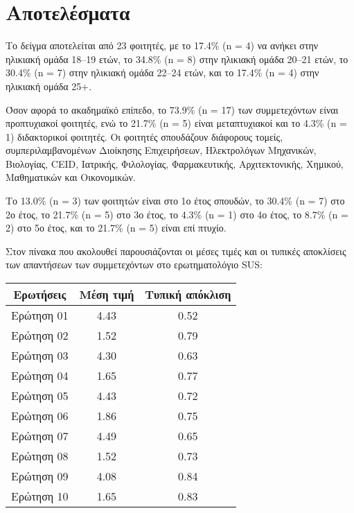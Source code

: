     \section{Αποτελέσματα}
        Το δείγμα αποτελείται από 23 φοιτητές, με το 17.4\% (n = 4) να ανήκει στην ηλικιακή ομάδα 18--19 ετών, το 34.8\% (n = 8) στην ηλικιακή ομάδα 20--21 ετών, το 30.4\% (n = 7) στην ηλικιακή ομάδα 22--24 ετών, και το 17.4\% (n = 4) στην ηλικιακή ομάδα 25+.

        Όσον αφορά το ακαδημαϊκό επίπεδο, το 73.9\% (n = 17) των συμμετεχόντων είναι προπτυχιακοί φοιτητές, ενώ το 21.7\% (n = 5) είναι μεταπτυχιακοί και το 4.3\% (n = 1) διδακτορικοί φοιτητές. Οι φοιτητές σπουδάζουν διάφορους τομείς, συμπεριλαμβανομένων Διοίκησης Επιχειρήσεων, Ηλεκτρολόγων Μηχανικών, Βιολογίας, CEID, Ιατρικής, Φιλολογίας, Φαρμακευτικής, Αρχιτεκτονικής, Χημικού, Μαθηματικών και Οικονομικών.

        Το 13.0\% (n = 3) των φοιτητών είναι στο 1ο έτος σπουδών, το 30.4\% (n = 7) στο 2ο έτος, το 21.7\% (n = 5) στο 3ο έτος, το 4.3\% (n = 1) στο 4ο έτος, το 8.7\% (n = 2) στο 5ο έτος, και το 21.7\% (n = 5) είναι επί πτυχίο.

        Στον πίνακα που ακολουθεί παρουσιάζονται οι μέσες τιμές και οι τυπικές αποκλίσεις των απαντήσεων των συμμετεχόντων στο ερωτηματολόγιο SUS:
        \begin{table}[H] \noindent\centering \small
                \begin{tabular}{c|c|c}
                   \textbf{Ερωτήσεις} & \textbf{Μέση τιμή} & \textbf{Τυπική απόκλιση} \\
                    \midrule
                    Ερώτηση 01 & 4.43 & 0.52 \\
                    Ερώτηση 02 & 1.52 & 0.79 \\
                    Ερώτηση 03 & 4.30 & 0.63 \\
                    Ερώτηση 04 & 1.65 & 0.77 \\
                    Ερώτηση 05 & 4.43 & 0.72 \\
                    Ερώτηση 06 & 1.86 & 0.75 \\
                    Ερώτηση 07 & 4.49 & 0.65 \\
                    Ερώτηση 08 & 1.52 & 0.73 \\
                    Ερώτηση 09 & 4.08 & 0.84 \\
                    Ερώτηση 10 & 1.65 & 0.83 \\
                \end{tabular}
        \end{table}

